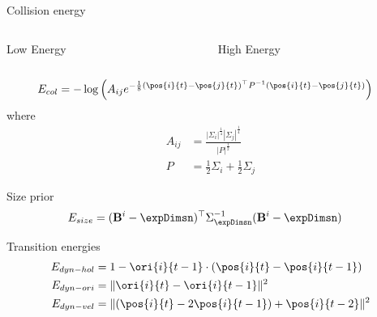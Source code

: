 \begin{frame}{Collision energy}
  \begin{columns}
    \begin{column}[t]{0.5\textwidth}
      \centering
      Low Energy

    \end{column}
    \begin{column}[t]{0.5\textwidth}
      \centering
      High Energy

    \end{column}
  \end{columns}
  \begin{align}
    \EnergyCol &= -\log\left(
  A_{ij}
  e^{-\frac{1}{8}
    \left(\pos{i}{t} - \pos{j}{t}\right)^\top
    P^{-1}
    \left(\pos{i}{t} - \pos{j}{t}\right)
    }
    \right)
  \end{align}
  where 
  \begin{align}
    A_{ij} &= \frac{|\Sigma_i|^\frac{1}{4}|\Sigma_j|^\frac{1}{4}}
    {|P|^\frac{1}{2}}\\
    P &= \frac{1}{2}\Sigma_i + \frac{1}{2}\Sigma_j
  \end{align}
\end{frame}

\begin{frame}{Size prior}
\begin{align}
  \label{eq:totalSizeEnergy}
  \Energy{size} &= (\dimsn{i} - \expDimsn)^\top\Sigma_{\expDimsn}^{-1}(\dimsn{i} -
  \expDimsn)
\end{align}
\end{frame}

\begin{frame}{Transition energies}
\begin{align}
  \label{eq:totalPosTransitionEnergy}
  \Energy{dyn-hol} &= 1 - \ori{i}{t-1} \cdot (\pos{i}{t} - \pos{i}{t-1}) \\
  \Energy{dyn-ori} &= \|\ori{i}{t} - \ori{i}{t-1}\|^2\\ 
  \Energy{dyn-vel} &= \|(\pos{i}{t} - 2\pos{i}{t-1}) + \pos{i}{t-2}\|^2
\end{align}
    
\end{frame}
